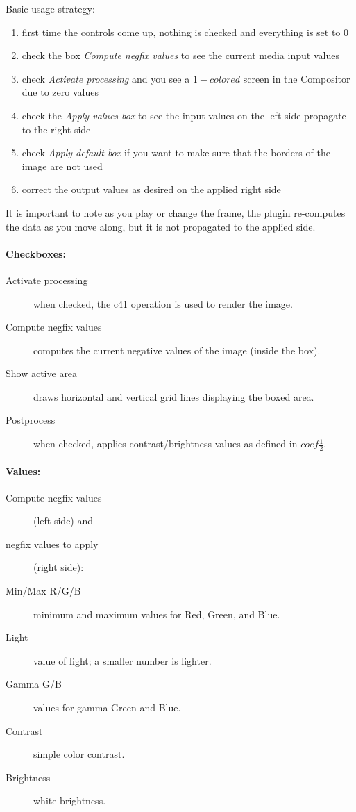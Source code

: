 Basic usage strategy:
\begin{enumerate}
    \item first time the controls come up, nothing is checked and everything is set to $0$
    \item check the box \textit{Compute negfix values} to see the current media input values
    \item check \textit{Activate processing} and you see a $1-colored$ screen in the Compositor due to zero values
    \item check the \textit{Apply values box} to see the input values on the left side propagate to the right side
    \item check \textit{Apply default box} if you want to make sure that the borders of the image are not used
    \item correct the output values as desired on the applied right side
\end{enumerate}

It is important to note as you play or change the frame, the plugin re-computes the data as you move along, but it is not propagated to the applied side.


\paragraph{Checkboxes:}
    \begin{description}
        \item[Activate processing] when checked, the c41 operation is used to render the image.
        \item[Compute negfix values] computes the current negative values of the image (inside the box).
        \item[Show active area] draws horizontal and vertical grid lines displaying the boxed area.
        \item[Postprocess] when checked, applies contrast/brightness values as defined in $coef\frac{1}{2}$.
    \end{description}
\paragraph{Values:}
    \begin{description}
        \item[Compute negfix values] (left side) and
        \item[negfix values to apply] (right side):
        \item[Min/Max R/G/B] minimum and maximum values for Red, Green, and Blue.
        \item[Light] value of light; a smaller number is lighter.
        \item[Gamma G/B] values for gamma Green and Blue.
        \item[Contrast] simple color contrast.
        \item[Brightness] white brightness.
    \end{description}
